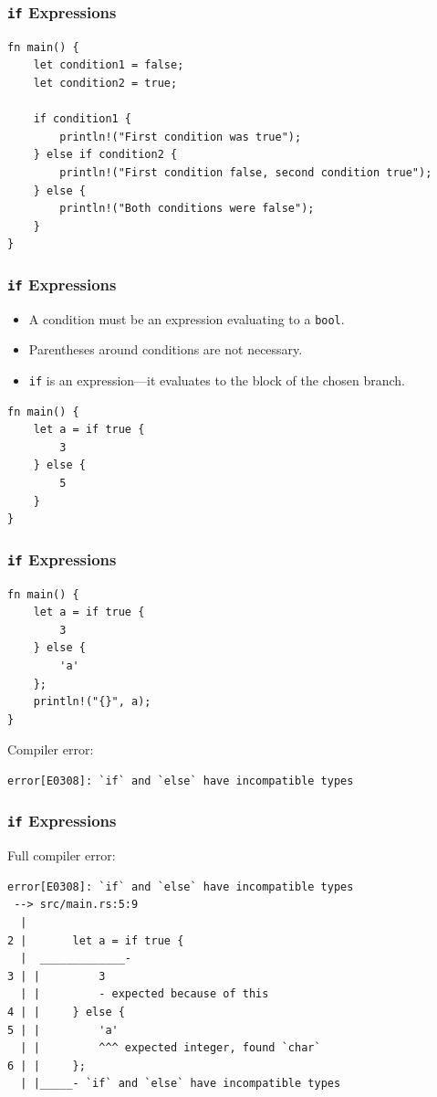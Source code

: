 \documentclass[aspectratio=169]{beamer}
\begin{document}
\begin{frame}[fragile]
    \frametitle{\texttt{if} Expressions}
    \begin{verbatim}
fn main() {
    let condition1 = false;
    let condition2 = true;

    if condition1 {
        println!("First condition was true");
    } else if condition2 {
        println!("First condition false, second condition true");
    } else {
        println!("Both conditions were false");
    }
}
    \end{verbatim}
\end{frame}

\begin{frame}[fragile]
    \frametitle{\texttt{if} Expressions}
    \begin{itemize}
        \item A condition must be an expression evaluating to a \texttt{bool}.
        \item Parentheses around conditions are not necessary.
        \pause
        \vspace{.5cm}
        \item \texttt{if} is an expression---it evaluates to the block of the chosen branch.
    \end{itemize}
    \pause
    \begin{verbatim}
fn main() {
    let a = if true {
        3
    } else {
        5
    }
}
    \end{verbatim}
\end{frame}

\begin{frame}[fragile]
    \frametitle{\texttt{if} Expressions}
    \begin{verbatim}
fn main() {
    let a = if true {
        3
    } else {
        'a'
    };
    println!("{}", a);
}
    \end{verbatim}
    \pause
    Compiler error:
    \begin{verbatim}
error[E0308]: `if` and `else` have incompatible types
    \end{verbatim}
\end{frame}

\begin{frame}[fragile]
    \frametitle{\texttt{if} Expressions}
    Full compiler error:
    \begin{verbatim}
error[E0308]: `if` and `else` have incompatible types
 --> src/main.rs:5:9
  |
2 |       let a = if true {
  |  _____________-
3 | |         3
  | |         - expected because of this
4 | |     } else {
5 | |         'a'
  | |         ^^^ expected integer, found `char`
6 | |     };
  | |_____- `if` and `else` have incompatible types
    \end{verbatim}
\end{frame}
\end{document}
